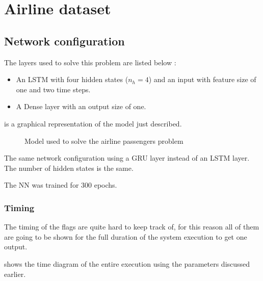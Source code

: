 \section{Airline dataset}
\label{sec:resAirline}

\subsection{Network configuration}

The layers used to solve this problem are listed below :

\begin{itemize}
  \item An \ac{LSTM} with four hidden states ($n_h=4$) and an input with feature size of one and two time steps.
  \item A Dense layer with an output size of one.
\end{itemize}

 is a graphical representation of the model just described.

\begin{figure}[H]
  \centering
  
  \caption{Model used to solve the airline passengers problem}
  \label{fig:airlineModel}
\end{figure}

The same network configuration using a \ac{GRU} layer instead of an \ac{LSTM} layer. The number of hidden states is the same.

The \ac{NN} was trained for $300$ epochs.

\subsubsection{Timing}

The timing of the flags are quite hard to keep track of, for this reason all of them are going to be shown for the full duration of the system execution to get one output.

 shows the time diagram of the entire execution using the parameters discussed earlier.

